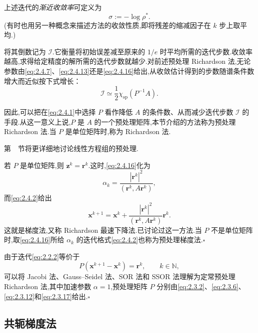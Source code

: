 上述迭代的\emph{渐近收敛率}可定义为
\begin{equation}\label{eq:2.4.18}
  \sigma:=-\log\rho^*.
\end{equation}
(有时也用另一种概念来描述方法的收敛性质,即将残差的缩减因子在 \(k\) 步上取平均.)

将其倒数记为 \(\mathcal I\).它衡量将初始误差减至原来的 \(1/e\) 时平均所需的迭代步数.收敛率越高,求得给定精度的解所需的迭代步数就越少.对前述预处理 Richardson 法,无论参数由\eqref{eq:2.4.7}、\eqref{eq:2.4.13}还是\eqref{eq:2.4.16}给出,从收敛估计得到的步数随谱条件数增大而近似按下式增长：
\begin{equation}\label{eq:2.4.19}
  \mathcal I\simeq\frac12\chi_{\mathrm{sp}}(P^{-1}A).
\end{equation}

因此,可以把在\eqref{eq:2.4.1}中选择 \(P\) 看作降低 \(A\) 的条件数、从而减少迭代步数 \(\mathcal I\) 的手段.从这一意义上说,\(P\) 是 \(A\) 的一个预处理矩阵,本节介绍的方法称为预处理 Richardson 法.当 \(P\) 是单位矩阵时,称为 Richardson 法.

第~~节将更详细地讨论线性方程组的预处理.

\begin{note}
若 \(P\) 是单位矩阵,则 \(\boldsymbol{z}^k=\boldsymbol{r}^k\).这时,\eqref{eq:2.4.16}化为
\[
  \alpha_k=\frac{|\boldsymbol{r}^k|^2}{(\boldsymbol{r}^k,A\boldsymbol{r}^k)},
\]
而\eqref{eq:2.4.2}给出
\begin{equation}\label{eq:2.4.20}
  \boldsymbol{x}^{k+1}=\boldsymbol{x}^k+\frac{|\boldsymbol{r}^k|^2}{(\boldsymbol{r}^k,A\boldsymbol{r}^k)}\boldsymbol{r}^k.
\end{equation}
这就是{\heiti 梯度法},又称 Richardson 最速下降法.已讨论过这一方法.当 \(P\) 不是单位矩阵时,取\eqref{eq:2.4.16}所给 \(\alpha_k\) 的迭代格式\eqref{eq:2.4.2}也称为{\heiti 预处理梯度法}.\hfill\(\square\)
\end{note}

\begin{note}
由于迭代\eqref{eq:2.2.2}等价于
\[
  P(\boldsymbol{x}^{k+1}-\boldsymbol{x}^k)=\boldsymbol{r}^k,\qquad k\in\mathbb N,
\]
可以将 Jacobi 法、Gauss--Seidel 法、SOR 法和 SSOR 法理解为定常预处理 Richardson 法,其中加速参数 \(\alpha=1\),预处理矩阵 \(P\) 分别由\eqref{eq:2.3.2}、\eqref{eq:2.3.6}、\eqref{eq:2.3.12}和\eqref{eq:2.3.17}给出.\hfill\(\square\)
\end{note}

\subsection{共轭梯度法}\label{sec:2.4.2}

